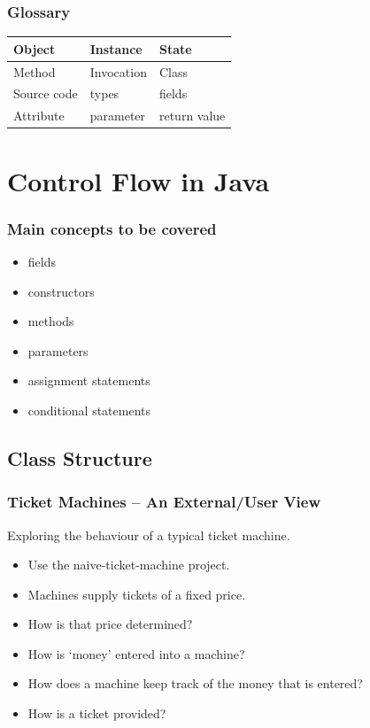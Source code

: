 \begin{frame}\frametitle{Glossary}
\begin{tabular}{|l|l|l|}
\hline
Object & Instance & State\\
\hline
Method & Invocation & Class\\
\hline
Source code & types & fields \\
\hline
Attribute & parameter & return value\\
\hline
\end{tabular}
\end{frame}


\section{Control Flow in Java}

\begin{frame}
\frametitle{Main concepts to be covered}
\begin{itemize}
\item fields
\item constructors
\item methods
\item parameters
\item assignment statements
\item conditional statements
\end{itemize}
\end{frame}

\subsection{Class Structure}

\begin{frame}
\frametitle{Ticket Machines – An External/User View}
Exploring the behaviour of a typical ticket machine.
\begin{itemize}
\item Use the naive-ticket-machine project.
\item Machines supply tickets of a fixed price.
\item How is that price determined?
\item How is ‘money’ entered into a machine?
\item How does a machine keep track of the money that is entered?
\item How is a ticket provided?
\end{itemize}
\end{frame}

